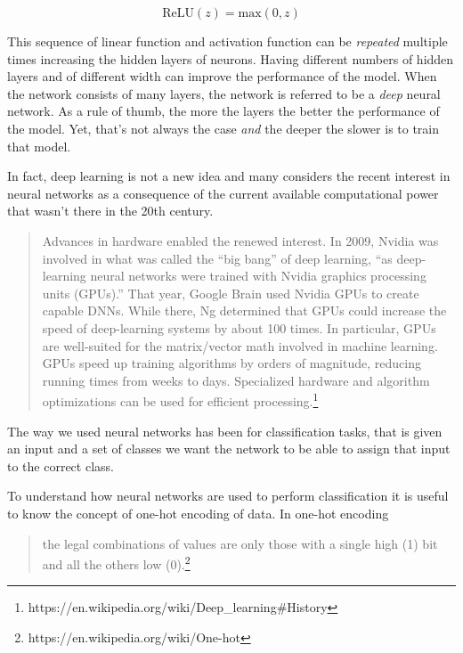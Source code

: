 \begin{equation}
  \text{ReLU}(z) = \text{max}(0, z)
\end{equation}

This sequence of linear function and activation function can be 
\emph{repeated} multiple times increasing the hidden layers of neurons.
Having different numbers of hidden layers and of different width can
improve the performance of the model. When the network consists of
many layers, the network is referred to be a \emph{deep} neural
network. As a rule of thumb, the more the layers the better the performance
of the model. Yet, that's not always the case \emph{and} the deeper the
slower is to train that model.

In fact, deep learning is not a new idea and many considers the recent
interest in neural networks as a consequence of the current available
computational power that wasn't there in the 20th century.

\begin{quote}
  Advances in hardware enabled the renewed interest. In 2009, Nvidia
  was involved in what was called the ``big bang'' of deep learning, ``as
  deep-learning neural networks were trained with Nvidia graphics
  processing units (GPUs).'' That year, Google Brain used Nvidia GPUs to
  create capable DNNs. While there, Ng determined that GPUs could
  increase the speed of deep-learning systems by about 100 times. In
  particular, GPUs are well-suited for the matrix/vector math involved
  in machine learning. GPUs speed up training algorithms by orders of
  magnitude, reducing running times from weeks to days. Specialized
  hardware and algorithm optimizations can be used for efficient
  processing.\footnote{https://en.wikipedia.org/wiki/Deep\_learning\#History}
\end{quote}

The way we used neural networks has been for classification tasks, that
is given an input and a set of classes we want the network to be able
to assign that input to the correct class.

To understand how neural networks are used to perform classification it
is useful to know the concept of one-hot encoding of data. In one-hot
encoding

\begin{quote}
the legal combinations of values are only those with a single high (1)
bit and all the others low
(0).\footnote{https://en.wikipedia.org/wiki/One-hot}
\end{quote}

